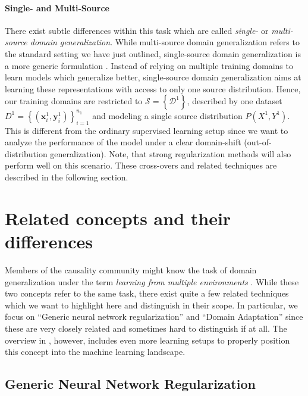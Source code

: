 \paragraph{Single- and Multi-Source}
There exist subtle differences within this task which are called \emph{single-} or \emph{multi-source domain generalization}. While multi-source domain generalization refers to the standard setting we have just outlined, single-source domain generalization is a more generic formulation \citep{zunino2020explainable}. Instead of relying on multiple training domains to learn models which generalize better, single-source domain generalization aims at learning these representations with access to only one source distribution. Hence, our training domains are restricted to $\mathcal{S} = \left\{\mathcal{D}^{1}\right\}$, described by one dataset $D^1=\left\{\left(\mathbf{x}^1_{i}, \mathbf{y}^1_{i}\right)\right\}_{i=1}^{n_{1}}$ and modeling a single source distribution $P\left(X^1, Y^1\right)$. This is different from the ordinary supervised learning setup since we want to analyze the performance of the model under a clear domain-shift (\ie out-of-distribution generalization). Note, that strong regularization methods will also perform well on this scenario. These cross-overs and related techniques are described in the following section.

\section{Related concepts and their differences}

Members of the causality community might know the task of domain generalization under the term \emph{learning from multiple environments} \citep{arjovsky2019invariant, gulrajani2020search, PetBuhMei15}. While these two concepts refer to the same task, there exist quite a few related techniques which we want to highlight here and distinguish in their scope. In particular, we focus on ``Generic neural network regularization'' and ``Domain Adaptation'' since these are very closely related and sometimes hard to distinguish if at all. The overview in , however, includes even more learning setups to properly position this concept into the machine learning landscape.

\subsection{Generic Neural Network Regularization}

